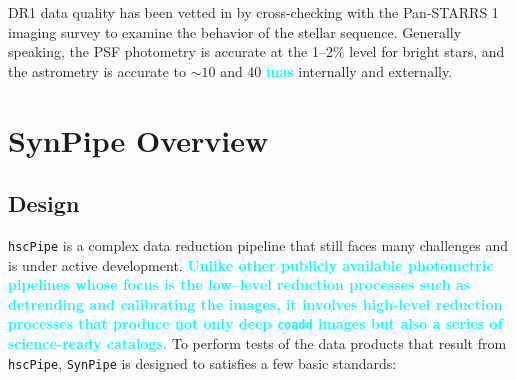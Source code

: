 \documentclass[useamsfonts]{pasj01}
\def\hscpipe{\texttt{hscPipe}}
\def\synpipe{\texttt{SynPipe}}
\def\coadd{\texttt{coadd}}
\newcommand{\song}[1]{\textcolor{cyan} {\textbf{#1}}}
\begin{document}
    DR1 data quality has been vetted in \citet{HSCDR1} by cross-checking with the 
    Pan-STARRS 1 imaging survey to examine the behavior of the stellar sequence.
    Generally speaking, the PSF photometry is accurate at the 1--2\% level for bright 
    stars, and the astrometry is accurate to ${\sim}10$ and 40 \song{mas} internally 
    and externally.


\section{SynPipe Overview}
    \label{sec:synpipe}

\subsection{Design}
    \label{ssec:design}

    \hscpipe{} is a complex data reduction pipeline that still faces many challenges
    and is under active development.
    \song{Unlike other publicly available photometric pipelines whose focus is the
    low--level reduction processes such as detrending and calibrating the images,
    it involves high-level reduction processes that produce not only deep \coadd{} 
    images but also a series of science-ready catalogs.} 
    To perform tests of the data products that result from \hscpipe{}, \synpipe{} is 
    designed to satisfies a few basic standards:
\end{document}
